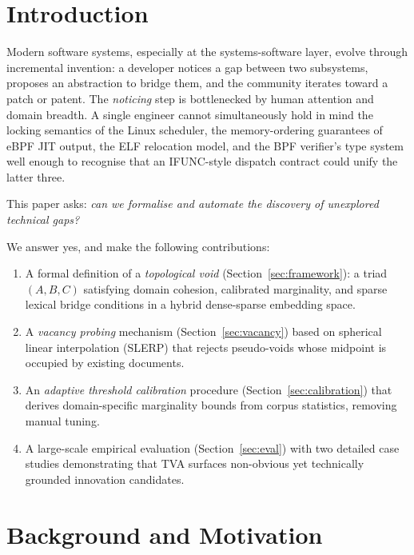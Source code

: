 \documentclass[11pt,twocolumn]{article}
\begin{document}
\section{Introduction}
\label{sec:intro}

Modern software systems, especially at the systems-software layer,
evolve through incremental invention: a developer notices a gap
between two subsystems, proposes an abstraction to bridge them, and
the community iterates toward a patch or patent.  The \emph{noticing}
step is bottlenecked by human attention and domain breadth.  A single
engineer cannot simultaneously hold in mind the locking semantics of
the Linux scheduler, the memory-ordering guarantees of eBPF JIT
output, the ELF relocation model, and the BPF verifier's type system
well enough to recognise that an IFUNC-style dispatch contract could
unify the latter three.

This paper asks: \emph{can we formalise and automate the discovery of unexplored technical gaps?}

We answer yes, and make the following contributions:
\begin{enumerate}
\item A formal definition of a \emph{topological void}
  (Section~\ref{sec:framework}): a triad $(A, B, C)$ satisfying
  domain cohesion, calibrated marginality, and sparse lexical bridge
  conditions in a hybrid dense-sparse embedding space.

\item A \emph{vacancy probing} mechanism
  (Section~\ref{sec:vacancy}) based on spherical linear interpolation
  (SLERP) that rejects pseudo-voids whose midpoint is occupied by
  existing documents.

\item An \emph{adaptive threshold calibration} procedure
  (Section~\ref{sec:calibration}) that derives domain-specific
  marginality bounds from corpus statistics, removing manual tuning.

\item A large-scale empirical evaluation
  (Section~\ref{sec:eval}) with two detailed case studies demonstrating
  that TVA surfaces non-obvious yet technically grounded innovation
  candidates.
\end{enumerate}

\section{Background and Motivation}
\label{sec:background}
\end{document}
